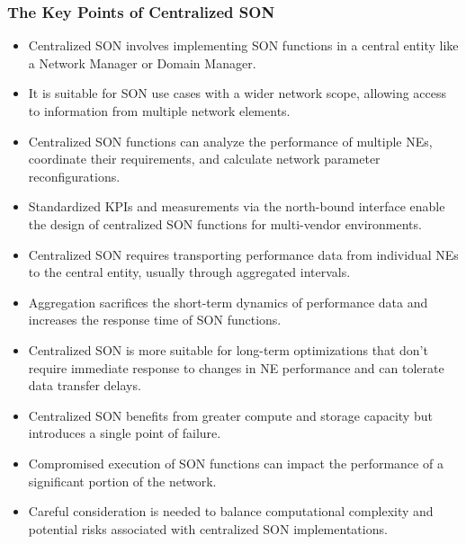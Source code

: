 \subsubsection{The Key Points of Centralized SON}
\begin{itemize}

\item Centralized SON involves implementing SON functions in a central entity like a Network Manager or Domain Manager.

\item It is suitable for SON use cases with a wider network scope, allowing access to information from multiple network elements.

\item Centralized SON functions can analyze the performance of multiple NEs, coordinate their requirements, and calculate network parameter reconfigurations.

\item Standardized KPIs and measurements via the north-bound interface enable the design of centralized SON functions for multi-vendor environments.

\item Centralized SON requires transporting performance data from individual NEs to the central entity, usually through aggregated intervals.

\item Aggregation sacrifices the short-term dynamics of performance data and increases the response time of SON functions.

\item Centralized SON is more suitable for long-term optimizations that don't require immediate response to changes in NE performance and can tolerate data transfer delays.

\item Centralized SON benefits from greater compute and storage capacity but introduces a single point of failure.

\item Compromised execution of SON functions can impact the performance of a significant portion of the network.

\item Careful consideration is needed to balance computational complexity and potential risks associated with centralized SON implementations.


\end{itemize}



